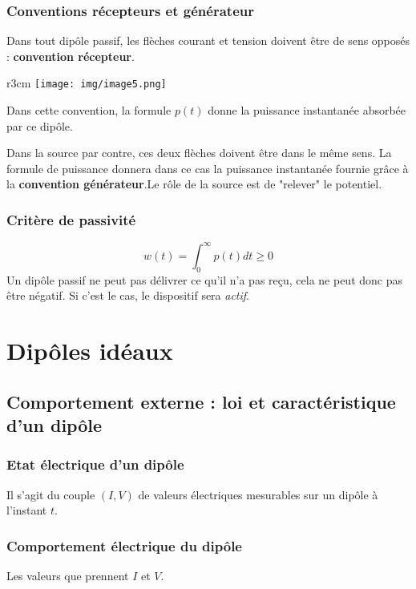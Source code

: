 \documentclass	[11pt, a4paper, openany]{book}
\begin{document}
	\subsection{Conventions récepteurs et générateur}
	Dans tout dipôle passif, les flèches courant et tension doivent être de sens opposés : \textbf{convention récepteur}.\\
	\begin{wrapfigure}[8]{r}{3cm}
		\texttt{[image: img/image5.png]}
	\end{wrapfigure} Dans cette convention, la formule $p(t)$ donne la puissance instantanée absorbée par ce dipôle.
	
	Dans la source par contre, ces deux flèches doivent être dans le même sens. La formule de puissance donnera dans ce cas la puissance instantanée fournie grâce à la \textbf{convention générateur}.Le rôle de la source est de "relever" le potentiel.
	
	\subsection{Critère de passivité}
	\begin{equation}
		w(t) = \int_0^\infty p(t)dt \geq 0
	\end{equation}
	Un dipôle passif ne peut pas délivrer ce qu'il n'a pas reçu, cela ne peut donc pas être négatif. Si c'est le cas, le dispositif sera \textit{actif}.
	
	\chapter{Dipôles idéaux}
	
	\section{Comportement externe : loi et caractéristique d'un dipôle}
	\subsection{Etat électrique d'un dipôle}
	Il s'agit du couple $(I,V)$ de valeurs électriques mesurables sur un dipôle à l'instant $t$.
	
	\subsection{Comportement électrique du dipôle}
	Les valeurs que prennent $I$ et $V$.
	
\end{document}
